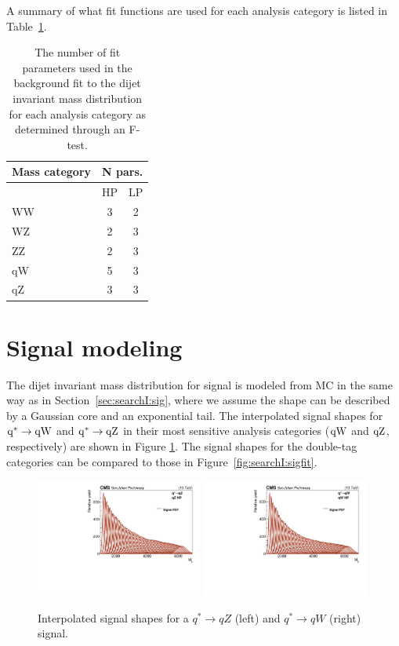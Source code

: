 A summary of what fit functions are used for each analysis category is listed in Table~\ref{tab:searchII:fitpars}.
\begin{table}[h!]
\centering
\begin{tabular}{|l| c | c|}
\hline
Mass category & \multicolumn{2}{|c|}{N pars.}\\
\hline
& HP & LP \\
\hline
WW & 3 & 2 \\
WZ & 2 & 3 \\
ZZ & 2 & 3 \\
qW & 5 & 3 \\
qZ & 3 & 3 \\
\hline
\end{tabular}
\caption{The number of fit parameters used in the background fit to the dijet invariant mass distribution for each analysis category as determined through an F-test.}
\label{tab:searchII:fitpars}
\end{table}
\clearpage
\section{Signal modeling}
The dijet invariant mass distribution for signal is modeled from MC in the same way as in Section~\ref{sec:searchI:sig}, where we assume the shape can be described by a Gaussian core and an exponential tail. The interpolated signal shapes for $\rm{q}^* \rightarrow \rm{q}\mathrm{W}$ and $\rm{q}^* \rightarrow \rm{q}\mathrm{Z}$ in their most sensitive analysis categories ($\rm{q}\mathrm{W}$ and $\rm{q}\mathrm{Z}$, respectively) are shown in Figure \ref{fig:searchII:interpolation}. The signal shapes for the double-tag categories can be compared to those in Figure~\ref{fig:searchI:sigfit}.
\begin{figure}[h!]
\centering
\includegraphics[width=0.49\textwidth]{figures/analysis/search2/AN-16-235/plots/interpolation_QstarQZ_DijetMassHighPuriqZ.pdf}
\includegraphics[width=0.49\textwidth]{figures/analysis/search2/AN-16-235/plots/interpolation_QstarQW_DijetMassHighPuriqW.pdf}\\
\caption{Interpolated signal shapes for a  $q^*\rightarrow qZ$ (left) and $q^*\rightarrow qW$ (right) signal.}
\label{fig:searchII:interpolation}
\end{figure}
\clearpage

